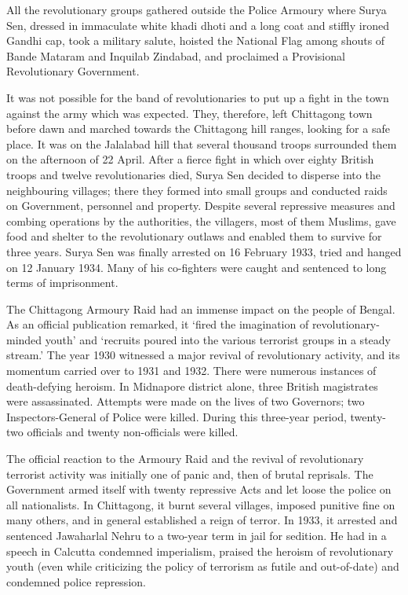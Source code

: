 \begin{multicols}{2}
All the revolutionary groups gathered outside the Police Armoury where Surya Sen, dressed in immaculate white khadi dhoti and a long coat and stiffly ironed Gandhi cap, took a military salute, hoisted the National Flag among shouts of Bande Mataram and Inquilab Zindabad, and proclaimed a Provisional Revolutionary Government.

It was not possible for the band of revolutionaries to put up a fight in the town against the army which was expected. They, therefore, left Chittagong town before dawn and marched towards the Chittagong hill ranges, looking for a safe place. It was on the Jalalabad hill that several thousand troops surrounded them on the afternoon of 22 April. After a fierce fight in which over eighty British troops and twelve revolutionaries died, Surya Sen decided to disperse into the neighbouring villages; there they formed into small groups and conducted raids on Government, personnel and property. Despite several repressive measures and combing operations by the authorities, the villagers, most of them Muslims, gave food and shelter to the revolutionary outlaws and enabled them to survive for three years. Surya Sen was finally arrested on 16 February 1933, tried and hanged on 12 January 1934. Many of his co-fighters were caught and sentenced to long terms of imprisonment.

The Chittagong Armoury Raid had an immense impact on the people of Bengal. As an official publication remarked, it `fired the imagination of revolutionary-minded youth' and `recruits poured into the various terrorist groups in a steady stream.' The year 1930 witnessed a major revival of revolutionary activity, and its momentum carried over to 1931 and 1932. There were numerous instances of death-defying heroism. In Midnapore district alone, three British magistrates were assassinated. Attempts were made on the lives of two Governors; two Inspectors-General of Police were killed. During this three-year period, twenty-two officials and twenty non-officials were killed.

The official reaction to the Armoury Raid and the revival of revolutionary terrorist activity was initially one of panic and, then of brutal reprisals. The Government armed itself with twenty repressive Acts and let loose the police on all nationalists. In Chittagong, it burnt several villages, imposed punitive fine on many others, and in general established a reign of terror. In 1933, it arrested and sentenced Jawaharlal Nehru to a two-year term in jail for sedition. He had in a speech in Calcutta condemned imperialism, praised the heroism of revolutionary youth (even while criticizing the policy of terrorism as futile and out-of-date) and condemned police repression.


\end{multicols}
